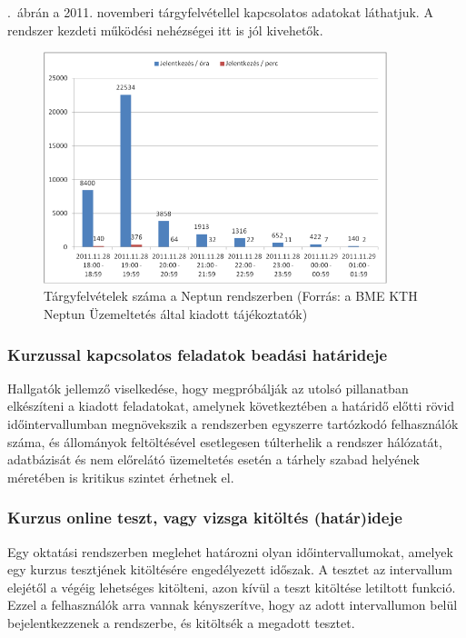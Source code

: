 .~ábrán a 2011. novemberi tárgyfelvétellel kapcsolatos adatokat láthatjuk. A rendszer kezdeti működési nehézségei itt is jól kivehetők.

\begin{figure}[!ht]
\centering
\includegraphics[width=100mm, keepaspectratio]{figures/neptun_005.png}
\caption{Tárgyfelvételek száma a Neptun rendszerben (Forrás: a BME KTH Neptun Üzemeltetés által kiadott tájékoztatók)}
\label{fig:neptun_005}
\end{figure}

\subsubsection{Kurzussal kapcsolatos feladatok beadási határideje}

Hallgatók jellemző viselkedése, hogy megpróbálják az utolsó pillanatban elkészíteni a kiadott feladatokat, amelynek következtében a határidő előtti rövid időintervallumban megnövekszik a rendszerben egyszerre tartózkodó felhasználók száma, és állományok feltöltésével esetlegesen túlterhelik a rendszer hálózatát, adatbázisát és nem előrelátó üzemeltetés esetén a tárhely szabad helyének méretében is kritikus szintet érhetnek el.

\subsubsection{Kurzus online teszt, vagy vizsga kitöltés (határ)ideje}

Egy oktatási rendszerben meglehet határozni olyan időintervallumokat, amelyek egy kurzus tesztjének kitöltésére engedélyezett időszak. A tesztet az intervallum elejétől a végéig lehetséges kitölteni, azon kívül a teszt kitöltése letiltott funkció. Ezzel a felhasználók arra vannak kényszerítve, hogy az adott intervallumon belül bejelentkezzenek a rendszerbe, és kitöltsék a megadott tesztet.

